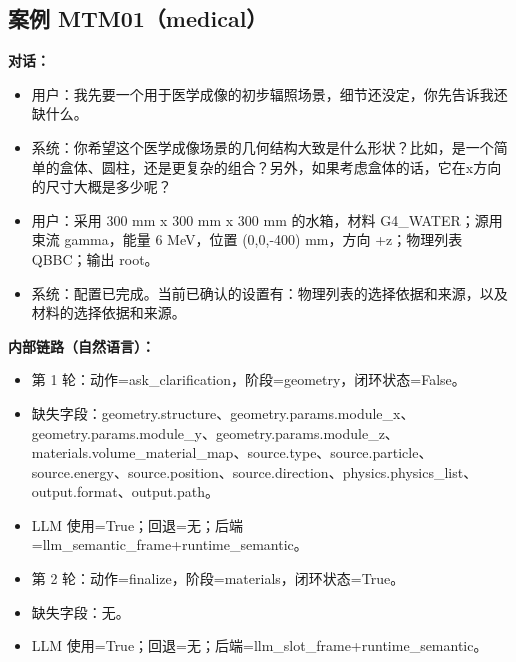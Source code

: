 \documentclass[11pt]{ctexart}
\begin{document}
\subsection{案例 MTM01（medical）}
\textbf{对话：}
\begin{itemize}
\item 用户：我先要一个用于医学成像的初步辐照场景，细节还没定，你先告诉我还缺什么。
\item 系统：你希望这个医学成像场景的几何结构大致是什么形状？比如，是一个简单的盒体、圆柱，还是更复杂的组合？另外，如果考虑盒体的话，它在x方向的尺寸大概是多少呢？
\item 用户：采用 300 mm x 300 mm x 300 mm 的水箱，材料 G4\_WATER；源用束流 gamma，能量 6 MeV，位置 (0,0,-400) mm，方向 +z；物理列表 QBBC；输出 root。
\item 系统：配置已完成。当前已确认的设置有：物理列表的选择依据和来源，以及材料的选择依据和来源。
\end{itemize}
\textbf{内部链路（自然语言）：}
\begin{itemize}
\item 第 1 轮：动作=ask\_clarification，阶段=geometry，闭环状态=False。
\item 缺失字段：geometry.structure、geometry.params.module\_x、geometry.params.module\_y、geometry.params.module\_z、materials.volume\_material\_map、source.type、source.particle、source.energy、source.position、source.direction、physics.physics\_list、output.format、output.path。
\item LLM 使用=True；回退=无；后端=llm\_semantic\_frame+runtime\_semantic。
\item 第 2 轮：动作=finalize，阶段=materials，闭环状态=True。
\item 缺失字段：无。
\item LLM 使用=True；回退=无；后端=llm\_slot\_frame+runtime\_semantic。
\end{itemize}
\end{document}
